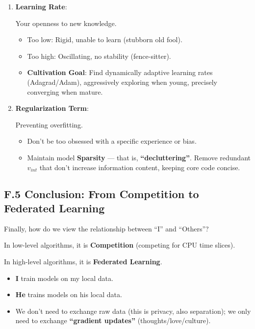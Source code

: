 \begin{enumerate}
\item \textbf{Learning Rate}:

Your openness to new knowledge.

\begin{itemize}
\item Too low: Rigid, unable to learn (stubborn old fool).

\item Too high: Oscillating, no stability (fence-sitter).

\item \textbf{Cultivation Goal}: Find dynamically adaptive learning rates (Adagrad/Adam), aggressively exploring when young, precisely converging when mature.
\end{itemize}

\item \textbf{Regularization Term}:

Preventing overfitting.

\begin{itemize}
\item Don't be too obsessed with a specific experience or bias.

\item Maintain model \textbf{Sparsity} --- that is, \textbf{``decluttering''}. Remove redundant $v_{int}$ that don't increase information content, keeping core code concise.
\end{itemize}
\end{enumerate}

\subsection{F.5 Conclusion: From Competition to Federated Learning}

Finally, how do we view the relationship between ``I'' and ``Others''?

In low-level algorithms, it is \textbf{Competition} (competing for CPU time slices).

In high-level algorithms, it is \textbf{Federated Learning}.

\begin{itemize}
\item \textbf{I} train models on my local data.

\item \textbf{He} trains models on his local data.

\item We don't need to exchange raw data (this is privacy, also separation); we only need to exchange \textbf{``gradient updates''} (thoughts/love/culture).
\end{itemize}

